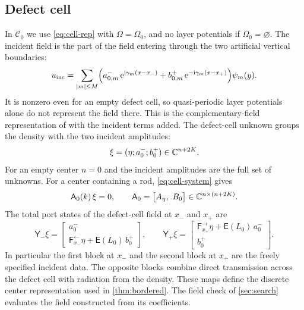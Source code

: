 \subsection{Defect cell}\label{sec:center}
In $\mathcal C_0$ we use \eqref{eq:cell-rep} with $\Omega=\Omega_0$, and no layer
potentials if $\Omega_0=\varnothing$. The incident field is the part of the
field entering through the two artificial vertical boundaries:
\[
  u_{\mathrm{inc}}=\sum_{|m|\le M}\Bigl(a^-_{0,m}\,\mathrm{e}^{\mathrm{i}\gamma_m(x-x_-)}
     +b^+_{0,m}\,\mathrm{e}^{-\mathrm{i}\gamma_m(x-x_+)}\Bigr)\psi_m(y).
\]
It is nonzero even for an empty defect cell, so quasi-periodic layer
potentials alone do not represent the field there. This is the complementary-field
representation of \cite[App.~A]{BarnettGreengard2010} with the incident
terms added. The defect-cell unknown groups the density with the two incident amplitudes:
\[
  \xi=(\eta;a^-_0;b^+_0)\in\mathbb{C}^{n+2K}.
\]
For an empty center $n=0$ and the incident amplitudes are the full set of
unknowns. For a center containing a rod, \eqref{eq:cell-system} gives
\begin{equation}\label{eq:center-rows}
  \mathsf A_0(k)\,\xi=0,\qquad \mathsf A_0=\bigl[A_\eta,\ B_0\bigr]\in\CC^{n\times(n+2K)} .
\end{equation}
The total port states of the defect-cell field at $x_-$ and $x_+$ are
\begin{equation}\label{eq:center-states}
  \mathsf Y_-\xi=\begin{bmatrix}a^-_0\\ \mathsf F^{\leftarrow}_{x_-}\eta+\mathsf E(L_0)\,b^+_0\end{bmatrix},
  \qquad
  \mathsf Y_+\xi=\begin{bmatrix}\mathsf F^{\rightarrow}_{x_+}\eta+\mathsf E(L_0)\,a^-_0\\ b^+_0\end{bmatrix}.
\end{equation}
In particular the first block at $x_-$ and the second block at $x_+$
are the freely specified incident data. The opposite blocks combine direct
transmission across the defect cell with radiation from the density.
These maps define the discrete center representation used in
\cref{thm:bordered}. The field check of \cref{sec:search} evaluates the
field constructed from its coefficients.
